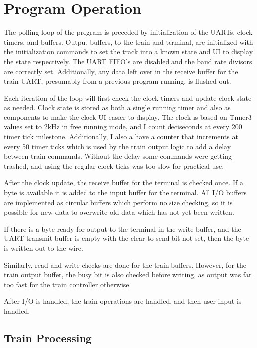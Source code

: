 \documentclass[pdftex,10pt,a4paper]{article}
\begin{document}
\section*{Program Operation}

The polling loop of the program is preceded by initialization of the
UARTs, clock timers, and buffers. Output buffers, to the train and
terminal, are initialized with the initialization commands to set the
track into a known state and UI to display the state respectively. The
UART FIFO's are disabled and the baud rate divisors are correctly
set. Additionally, any data left over in the receive buffer for the
train UART, presumably from a previous program running, is flushed
out.

Each iteration of the loop will first check the clock timers and
update clock state as needed. Clock state is stored as both a single
running timer and also as components to make the clock UI easier to
display. The clock is based on Timer3 values set to 2kHz in free
running mode, and I count deciseconds at every 200 timer tick
milestone. Additionally, I also a have a counter that increments at
every 50 timer ticks which is used by the train output logic to add a
delay between train commands. Without the delay some commands were
getting trashed, and using the regular clock ticks was too slow for
practical use.

After the clock update, the receive buffer for the terminal is checked
once. If a byte is available it is added to the input buffer for the
terminal. All I/O buffers are implemented as circular buffers which
perform no size checking, so it is possible for new data to overwrite
old data which has not yet been written.

If there is a byte ready for output to the terminal in the write
buffer, and the UART transmit buffer is empty with the clear-to-send
bit not set, then the byte is written out to the wire.

Similarly, read and write checks are done for the train
buffers. However, for the train output buffer, the busy bit is also
checked before writing, as output was far too fast for the
train controller otherwise.

After I/O is handled, the train operations are handled, and then user
input is handled.

\subsection*{Train Processing}
\end{document}
